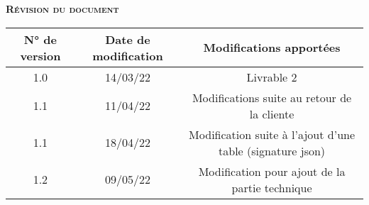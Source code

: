 \begin{center}
\textsc{\Large \textbf{Révision du document}}
\end{center}
\vspace{2cm}

\begin{tabular}{|c|c|c|}
    \hline
  N° de version & Date de modification & Modifications apportées  \\
    \hline
    1.0 & 14/03/22 & Livrable 2 \\ \hline
    1.1 & 11/04/22 & Modifications suite au retour de la cliente\\  \hline
    1.1 & 18/04/22 & Modification suite à l'ajout d'une table (signature json)\\ \hline
    1.2 & 09/05/22 & Modification pour ajout de la partie technique\\ 
    \hline
\end{tabular}